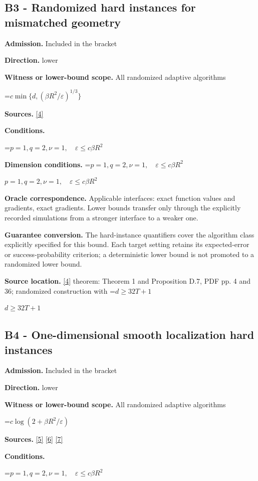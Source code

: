 \documentclass[10pt,a4paper]{article}
\newcommand{\AtlasMath}[1]{\par\begingroup\centering\setbox0=\hbox{$\displaystyle #1$}\ifdim\wd0>1.4\linewidth\typeout{ATLAS WIDE FORMULA: \the\wd0}\fi\ifdim\wd0>\linewidth\resizebox{\linewidth}{!}{\box0}\else\box0\fi\par\endgroup}
\newcommand{\AtlasInlineMath}[1]{\begingroup\setbox0=\hbox{$#1$}\ifdim\wd0>.4\linewidth\endgroup\AtlasMath{#1}\else\endgroup$#1$\fi}
\begin{document}
\subsection{B3 - Randomized hard instances for mismatched geometry}
\textbf{Admission.} Included in the bracket

\textbf{Direction.} lower

\textbf{Witness or lower-bound scope.} All randomized adaptive algorithms

\AtlasMath{c\min\{d,(\beta R^2/\varepsilon)^{1/3}\}}
\textbf{Sources.} \href{https://arxiv.org/pdf/2609.32910}{[4]}

\textbf{Conditions.} 
\AtlasMath{p=1,q=2,\nu=1,\quad\varepsilon\le c\beta R^2}


\textbf{Dimension conditions.} \AtlasInlineMath{p=1,q=2,\nu=1,\quad\varepsilon\le c\beta R^2}

\textbf{Oracle correspondence.} Applicable interfaces: exact function values and gradients, exact gradients. Lower bounds transfer only through the explicitly recorded simulations from a stronger interface to a weaker one.

\textbf{Guarantee conversion.} The hard-instance quantifiers cover the algorithm class explicitly specified for this bound. Each target setting retains its expected-error or success-probability criterion; a deterministic lower bound is not promoted to a randomized lower bound.

\textbf{Source location.} \href{https://arxiv.org/pdf/2609.32910}{[4]} theorem: Theorem 1 and Proposition D.7, PDF pp. 4 and 36; randomized construction with \AtlasInlineMath{d\ge32T+1}

\subsection{B4 - One-dimensional smooth localization hard instances}
\textbf{Admission.} Included in the bracket

\textbf{Direction.} lower

\textbf{Witness or lower-bound scope.} All randomized adaptive algorithms

\AtlasMath{c\log(2+\beta R^2/\varepsilon)}
\textbf{Sources.} \href{https://arxiv.org/pdf/2101.09740v2}{[5]} \href{https://arxiv.org/pdf/2609.33360v2}{[6]} \href{https://arxiv.org/pdf/2609.10874}{[7]}

\textbf{Conditions.} 
\AtlasMath{p=1,q=2,\nu=1,\quad\varepsilon\le c\beta R^2}
\end{document}
